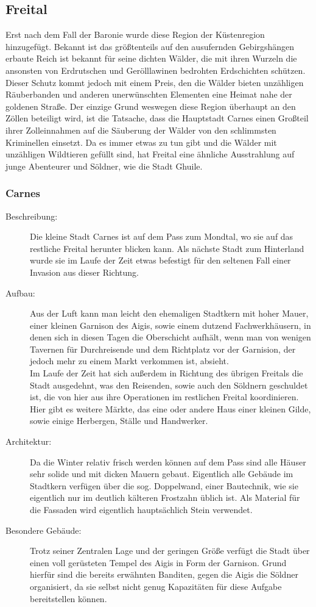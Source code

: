 \documentclass[a4paper,12pt,oneside]{book}
\begin{document}
\subsection{Freital}
Erst nach dem Fall der Baronie wurde diese Region der Küstenregion hinzugefügt. Bekannt ist das größtenteils auf den ausufernden Gebirgshängen erbaute Reich ist bekannt für seine dichten Wälder, die mit ihren Wurzeln die ansonsten von Erdrutschen und Gerölllawinen bedrohten Erdschichten schützen. Dieser Schutz kommt jedoch mit einem Preis, den die Wälder bieten unzähligen Räuberbanden und anderen unerwünschten Elementen eine Heimat nahe der goldenen Straße. Der einzige Grund weswegen diese Region überhaupt an den Zöllen beteiligt wird, ist die Tatsache, dass die Hauptstadt Carnes einen Großteil ihrer Zolleinnahmen auf die Säuberung der Wälder von den schlimmsten Kriminellen einsetzt. Da es immer etwas zu tun gibt und die Wälder mit unzähligen Wildtieren gefüllt sind, hat Freital eine ähnliche Ausstrahlung auf junge Abenteurer und Söldner, wie die Stadt Ghuile.

\subsubsection{Carnes}
\begin{description}
\item[Beschreibung:]Die kleine Stadt Carnes ist auf dem Pass zum Mondtal, wo sie auf das restliche Freital herunter blicken kann. Als nächste Stadt zum Hinterland wurde sie im Laufe der Zeit etwas befestigt für den seltenen Fall einer Invasion aus dieser Richtung.
\item[Aufbau:]Aus der Luft kann man leicht den ehemaligen Stadtkern mit hoher Mauer, einer kleinen Garnison des Aigis, sowie einem dutzend Fachwerkhäusern, in denen sich in diesen Tagen die Oberschicht aufhält, wenn man von wenigen Tavernen für Durchreisende und dem Richtplatz vor der Garnision, der jedoch mehr zu einem Markt verkommen ist, absieht.
\\Im Laufe der Zeit hat sich außerdem in Richtung des übrigen Freitals die Stadt ausgedehnt, was den Reisenden, sowie auch den Söldnern geschuldet ist, die von hier aus ihre Operationen im restlichen Freital koordinieren. Hier gibt es weitere Märkte, das eine oder andere Haus einer kleinen Gilde, sowie einige Herbergen, Ställe und Handwerker.
\item[Architektur:]Da die Winter relativ frisch werden können auf dem Pass sind alle Häuser sehr solide und mit dicken Mauern gebaut. Eigentlich alle Gebäude im Stadtkern verfügen über die sog. Doppelwand, einer Bautechnik, wie sie eigentlich nur im deutlich kälteren Frostzahn üblich ist. Als Material für die Fassaden wird eigentlich hauptsächlich Stein verwendet.
\item[Besondere Gebäude:]Trotz seiner Zentralen Lage und der geringen Größe verfügt die Stadt über einen voll gerüsteten Tempel des Aigis in Form der Garnison. Grund hierfür sind die bereits erwähnten Banditen, gegen die Aigis die Söldner organisiert, da sie selbst nicht genug Kapazitäten für diese Aufgabe bereitstellen können.
\end{description}
\end{document}
